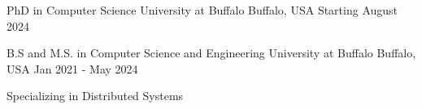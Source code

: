 

\begin{cventries}

  \cventry
   {PhD in Computer Science} %
   {University at Buffalo} %
   {Buffalo, USA} %
   {Starting August 2024} %
   {
     \begin{cvitems} %
     \end{cvitems}
   }

  \cventry
    {B.S and M.S. in Computer Science and Engineering} %
    {University at Buffalo} %
    {Buffalo, USA} %
    {Jan 2021 - May 2024} %
    {
      \begin{cvitems} %
        \item {Specializing in Distributed Systems}
      \end{cvitems}
    }



\end{cventries}
